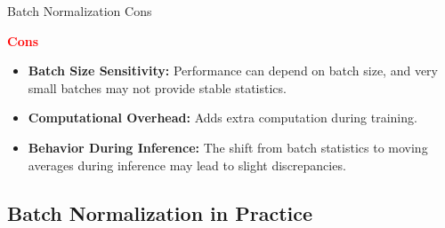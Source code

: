 \documentclass[serif, aspectratio=169]{beamer}
\begin{document}
\begin{frame}{Batch Normalization Cons}

    \textcolor{red}{\textbf{Cons}}
    
    \begin{itemize}

        \item \textbf{Batch Size Sensitivity:} Performance can depend on batch size, and very small batches may not provide stable statistics.
        \item \textbf{Computational Overhead:} Adds extra computation during training.
        \item \textbf{Behavior During Inference:} The shift from batch statistics to moving averages during inference may lead to slight discrepancies.

    \end{itemize}
\end{frame}

\subsection{Batch Normalization in Practice}


    


\end{document}
